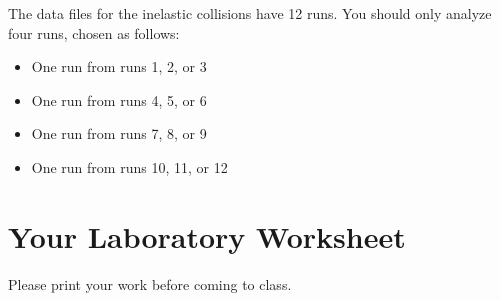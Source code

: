 The data files for the inelastic collisions have 12 runs. You should only analyze four runs, chosen as follows:
\begin{itemize}
    \item One run from runs 1, 2, or 3
    \item One run from runs 4, 5, or 6
    \item One run from runs 7, 8, or 9
    \item One run from runs 10, 11, or 12
\end{itemize}
%
%
\newpage
\section{Your Laboratory Worksheet}
%
Please print your work before coming to class.
%
